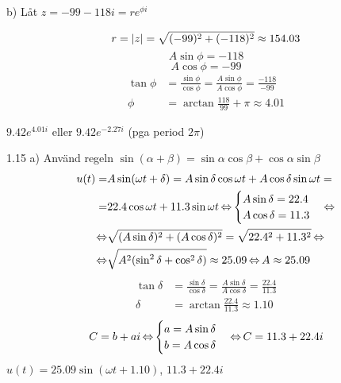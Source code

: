 \begin{task}{b)}
	Låt $z=-99-118i=re^{\phi i}$
	
	\[r=\left|z\right|=\sqrt{(-99)^2+(-118)^2}\approx154.03\]
	\[A\sin\phi=-118\]
	\[A\cos\phi=-99\]
	\begin{align*}
	\tan\phi&=
	\frac{\sin\phi}{\cos\phi}=
	\frac{A\sin\phi}{A\cos\phi}=
	\frac{-118}{-99} \\
	\phi&=
	\arctan\frac{118}{99}+\pi\approx 
	4.01
	\end{align*}
	
	\ans $9.42e^{4.01i}$ eller $9.42e^{-2.27i}$ (pga period $2\pi$)
\end{task}

\begin{task}{1.15 a)}
	Använd regeln $\sin(\alpha+\beta)=\sin\alpha\cos\beta+\cos\alpha\sin\beta$
	\begin{align*}
		u(t)=
		&A\sin(\omega t + \delta)=
		A\sin\delta\cos\omega t + A\cos\delta\sin\omega t= \\ =
		&22.4\cos\omega t + 11.3\sin\omega t \operatorname{\Leftrightarrow}
		\begin{cases}
		A\sin\delta = 22.4 \\
		A\cos\delta = 11.3
		\end{cases} \operatorname{\Leftrightarrow} \\ \operatorname{\Leftrightarrow}
		&\sqrt{(A\sin\delta)^2+(A\cos\delta)^2}=\sqrt{22.4^2+11.3^2} \operatorname{\Leftrightarrow} \\ \operatorname{\Leftrightarrow}
		&\sqrt{A^2(\sin^2\delta+\cos^2\delta)}\approx 25.09 \operatorname{\Leftrightarrow}
		A\approx 25.09
	\end{align*}
	\begin{align*}
	\tan\delta&=
	\frac{\sin\delta}{\cos\delta}=
	\frac{A\sin\delta}{A\cos\delta}=
	\frac{22.4}{11.3} \\
	\delta&=
	\arctan\frac{22.4}{11.3}\approx 
	1.10
	\end{align*}
	\[C=b+ai \operatorname{\Leftrightarrow}
	\begin{cases}
	a = A\sin\delta \\
	b = A\cos\delta
	\end{cases} \operatorname{\Leftrightarrow}
	C= 11.3+22.4i\]
	\ans $u(t)=25.09\sin(\omega t + 1.10)$, $11.3+22.4i$
\end{task}

